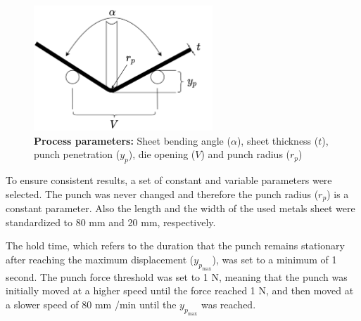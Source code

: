 \begin{figure}[h]
    \begin{tcolorbox}[arc=0pt,boxrule=0.5pt]
        \centering
        \includegraphics[trim=left botm right top, width=0.6\textwidth,
            clip]{chap4/images/process_parameters}
        \caption{\textbf{Process parameters:} Sheet bending angle ($\alpha$), sheet
        thickness ($t$), punch
        penetration ($y_p$), die opening ($V$) and punch radius ($r_p$)}
        \label{fig:process_parameters}
    \end{tcolorbox}
\end{figure}

To ensure consistent results, a set of constant and variable parameters were selected.
The punch was never changed and therefore the punch radius ($r_p$) is a constant parameter.
Also the length and the width of the used metals sheet were standardized to 80 mm and 20 mm, respectively.

The hold time, which refers to the duration that the punch remains stationary
after reaching the maximum displacement ($y_p_{\max}$), was set to a minimum of 1 second.
The punch force threshold was set to 1 N, meaning that the punch was initially moved at
a higher speed until the force reached 1 N, and then moved at a slower speed of 80 mm
/min until the $y_p_{\max}$ was reached.

